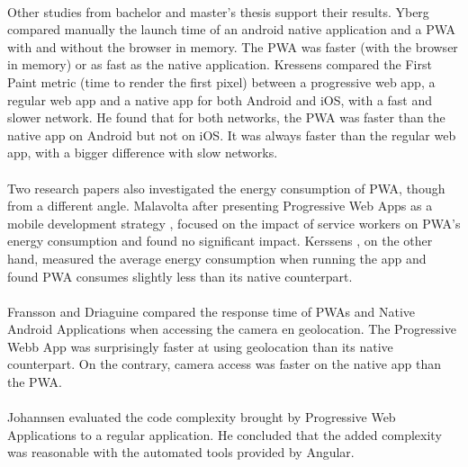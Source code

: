 \documentclass{kththesis}
\begin{document}
\paragraph{}
Other studies from bachelor and master's thesis support their results. Yberg \cite{YbergViktor2018NPaU} compared manually the launch time of an android native application and a PWA with and without the browser in memory. The PWA was faster (with the browser in memory) or as fast as the native application. Kressens \cite{PWAapplicability} compared the First Paint metric (time to render the first pixel) between a progressive web app, a regular web app and a native app for both Android and iOS, with a fast and slower network. He found that for both networks, the PWA was faster than the native app on Android but not on iOS. It was always faster than the regular web app, with a bigger difference with slow networks.


\paragraph{}
Two research papers also investigated the energy consumption of PWA, though from a different angle. Malavolta after presenting Progressive Web Apps as a mobile development strategy \cite{malavolta2016beyond}, focused on the impact of service workers on PWA's energy consumption and found no significant impact\cite{SW_and_energy}. Kerssens \cite{PWAapplicability}, on the other hand, measured the average energy consumption when running the app and found PWA consumes slightly less than its native counterpart. 

\paragraph{}
Fransson and Driaguine \cite{PWAbc_responsetime} compared the response time of PWAs and Native Android Applications when accessing the camera en geolocation. The Progressive Webb App was surprisingly faster at using geolocation than its native counterpart. On the contrary, camera access was faster on the native app than the PWA.

\paragraph{}
Johannsen \cite{JohannsenFabian2018PWAa} evaluated the code complexity brought by Progressive Web Applications to a regular application. He concluded that the added complexity was reasonable with the automated tools provided by Angular. 
\end{document}
